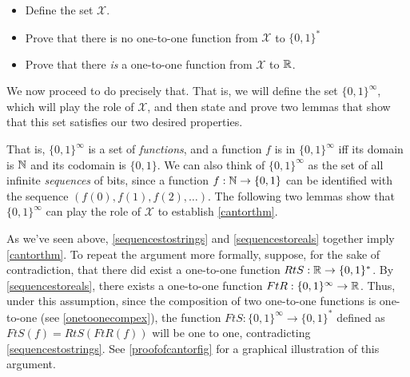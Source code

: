 \begin{itemize}
\item
  Define the set \(\mathcal{X}\).
\item
  Prove that there is no one-to-one function from \(\mathcal{X}\) to
  \(\{0,1\}^*\)
\item
  Prove that there \emph{is} a one-to-one function from \(\mathcal{X}\)
  to \({\mathbb{R}}\).
\end{itemize}

We now proceed to do precisely that. That is, we will define the set
\(\{0,1\}^\infty\), which will play the role of \(\mathcal{X}\), and
then state and prove two lemmas that show that this set satisfies our
two desired properties.

\hypertarget{bitsinfdef}{}

That is, \(\{0,1\}^\infty\) is a set of \emph{functions}, and a function
\(f\) is in \(\{0,1\}^\infty\) iff its domain is \({\mathbb{N}}\) and its codomain
is \(\{0,1\}\). We can also think of \(\{0,1\}^\infty\) as the set of
all infinite \emph{sequences} of bits, since a function
\(f:{\mathbb{N}} \rightarrow \{0,1\}\) can be identified with the sequence
\((f(0),f(1),f(2),\ldots )\). The following two lemmas show that
\(\{0,1\}^\infty\) can play the role of \(\mathcal{X}\) to establish
\cref{cantorthm}.

\hypertarget{sequencestostrings}{}

\hypertarget{sequencestoreals}{}

As we've seen above, \cref{sequencestostrings} and
\cref{sequencestoreals} together imply \cref{cantorthm}. To repeat the
argument more formally, suppose, for the sake of contradiction, that
there did exist a one-to-one function \(RtS:{\mathbb{R}} \rightarrow \{0,1\}^*\).
By \cref{sequencestoreals}, there exists a one-to-one function
\(FtR:\{0,1\}^\infty \rightarrow {\mathbb{R}}\). Thus, under this assumption,
since the composition of two one-to-one functions is one-to-one (see
\cref{onetoonecompex}), the function
\(FtS:\{0,1\}^\infty \rightarrow \{0,1\}^*\) defined as
\(FtS(f)=RtS(FtR(f))\) will be one to one, contradicting
\cref{sequencestostrings}. See \cref{proofofcantorfig} for a graphical
illustration of this argument.


